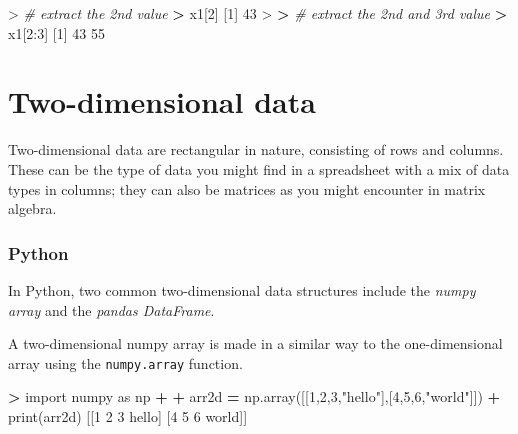 \documentclass[
]{book}
\newenvironment{Shaded}{\begin{snugshade}}{\end{snugshade}}
\newcommand{\BuiltInTok}[1]{#1}
\newcommand{\CommentTok}[1]{\textcolor[rgb]{0.56,0.35,0.01}{\textit{#1}}}
\newcommand{\DecValTok}[1]{\textcolor[rgb]{0.00,0.00,0.81}{#1}}
\newcommand{\ErrorTok}[1]{\textcolor[rgb]{0.64,0.00,0.00}{\textbf{#1}}}
\newcommand{\ImportTok}[1]{#1}
\newcommand{\NormalTok}[1]{#1}
\newcommand{\OperatorTok}[1]{\textcolor[rgb]{0.81,0.36,0.00}{\textbf{#1}}}
\newcommand{\SpecialCharTok}[1]{\textcolor[rgb]{0.00,0.00,0.00}{#1}}
\newcommand{\StringTok}[1]{\textcolor[rgb]{0.31,0.60,0.02}{#1}}
\begin{document}
\begin{Shaded}
\begin{Highlighting}[]
\SpecialCharTok{\textgreater{}} \CommentTok{\# extract the 2nd value}
\ErrorTok{\textgreater{}}\NormalTok{ x1[}\DecValTok{2}\NormalTok{]}
\NormalTok{[}\DecValTok{1}\NormalTok{] }\DecValTok{43}
\SpecialCharTok{\textgreater{}} 
\ErrorTok{\textgreater{}} \CommentTok{\# extract the 2nd and 3rd value}
\ErrorTok{\textgreater{}}\NormalTok{ x1[}\DecValTok{2}\SpecialCharTok{:}\DecValTok{3}\NormalTok{]}
\NormalTok{[}\DecValTok{1}\NormalTok{] }\DecValTok{43} \DecValTok{55}
\end{Highlighting}
\end{Shaded}

\hypertarget{two-dimensional-data}{%
\section{Two-dimensional data}\label{two-dimensional-data}}

Two-dimensional data are rectangular in nature, consisting of rows and columns. These can be the type of data you might find in a spreadsheet with a mix of data types in columns; they can also be matrices as you might encounter in matrix algebra.

\hypertarget{python-9}{%
\subsubsection*{Python}\label{python-9}}

In Python, two common two-dimensional data structures include the \emph{numpy array} and the \emph{pandas DataFrame}.

A two-dimensional numpy array is made in a similar way to the one-dimensional array using the \texttt{numpy.array} function.

\begin{Shaded}
\begin{Highlighting}[]
\OperatorTok{\textgreater{}} \ImportTok{import}\NormalTok{ numpy }\ImportTok{as}\NormalTok{ np}
\OperatorTok{+} 
\OperatorTok{+}\NormalTok{ arr2d }\OperatorTok{=}\NormalTok{ np.array([[}\DecValTok{1}\NormalTok{,}\DecValTok{2}\NormalTok{,}\DecValTok{3}\NormalTok{,}\StringTok{"hello"}\NormalTok{],[}\DecValTok{4}\NormalTok{,}\DecValTok{5}\NormalTok{,}\DecValTok{6}\NormalTok{,}\StringTok{"world"}\NormalTok{]])}
\OperatorTok{+} \BuiltInTok{print}\NormalTok{(arr2d)}
\NormalTok{[[}\StringTok{\textquotesingle{}1\textquotesingle{}} \StringTok{\textquotesingle{}2\textquotesingle{}} \StringTok{\textquotesingle{}3\textquotesingle{}} \StringTok{\textquotesingle{}hello\textquotesingle{}}\NormalTok{]}
\NormalTok{ [}\StringTok{\textquotesingle{}4\textquotesingle{}} \StringTok{\textquotesingle{}5\textquotesingle{}} \StringTok{\textquotesingle{}6\textquotesingle{}} \StringTok{\textquotesingle{}world\textquotesingle{}}\NormalTok{]]}
\end{Highlighting}
\end{Shaded}
\end{document}
